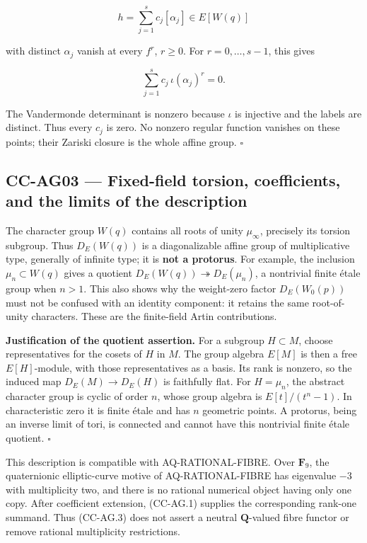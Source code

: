 \documentclass[11pt,a4paper]{article}
\theoremstyle{definition}\newtheorem{definition}[theorem]{Definition}
\theoremstyle{remark}\newtheorem{remark}[theorem]{Remark}
\begin{document}
\[
 h=\sum_{j=1}^s c_j[\alpha_j]\in E[W(q)]
\]

with distinct \(\alpha_j\) vanish at every \(f^r\), \(r\ge0\). For
\(r=0,\ldots,s-1\), this gives

\[
 \sum_{j=1}^s c_j\,\iota(\alpha_j)^r=0.
\]

The Vandermonde determinant is nonzero because \(\iota\) is injective
and the labels are distinct. Thus every \(c_j\) is zero. No nonzero
regular function vanishes on these points; their Zariski closure is the
whole affine group. \(\square\)

\subsection{CC-AG03 --- Fixed-field torsion, coefficients, and the
limits of the
description}\label{cc-ag03-fixed-field-torsion-coefficients-and-the-limits-of-the-description}

The character group \(W(q)\) contains all roots of unity \(\mu_\infty\),
precisely its torsion subgroup. Thus \(D_E(W(q))\) is a diagonalizable
affine group of multiplicative type, generally of infinite type; it is
\textbf{not a protorus}. For example, the inclusion
\(\mu_n\subset W(q)\) gives a quotient
\(D_E(W(q))\twoheadrightarrow D_E(\mu_n)\), a nontrivial finite étale
group when \(n>1\). This also shows why the weight-zero factor
\(D_E(W_0(p))\) must not be confused with an identity component: it
retains the same root-of-unity characters. These are the finite-field
Artin contributions.

\textbf{Justification of the quotient assertion.} For a subgroup
\(H\subset M\), choose representatives for the cosets of \(H\) in \(M\).
The group algebra \(E[M]\) is then a free \(E[H]\)-module, with those
representatives as a basis. Its rank is nonzero, so the induced map
\(D_E(M)\to D_E(H)\) is faithfully flat. For \(H=\mu_n\), the abstract
character group is cyclic of order \(n\), whose group algebra is
\(E[t]/(t^n-1)\). In characteristic zero it is finite étale and has
\(n\) geometric points. A protorus, being an inverse limit of tori, is
connected and cannot have this nontrivial finite étale quotient.
\(\square\)

This description is compatible with AQ-RATIONAL-FIBRE. Over
\(\mathbf F_9\), the quaternionic elliptic-curve motive of
AQ-RATIONAL-FIBRE has eigenvalue \(-3\) with multiplicity two, and there
is no rational numerical object having only one copy. After coefficient
extension, (CC-AG.1) supplies the corresponding rank-one summand. Thus
(CC-AG.3) does not assert a neutral \(\mathbf Q\)-valued fibre functor
or remove rational multiplicity restrictions.
\end{document}
